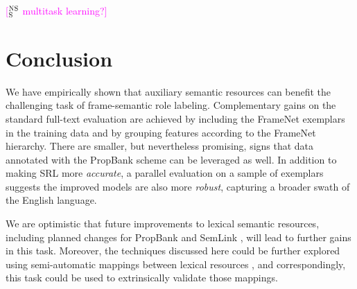 \documentclass[11pt,a4paper]{article}
\newcommand{\ensuretext}[1]{#1}
\newcommand{\nssmarker}{\ensuretext{\textcolor{magenta}{\ensuremath{^{\textsc{NS}}_{\textsc{S}}}}}}
\newcommand{\arkcomment}[3]{\ensuretext{\textcolor{#3}{[#1 #2]}}}
\newcommand{\nss}[1]{\arkcomment{\nssmarker}{#1}{magenta}}
\newcommand{\finalversion}[1]{}
\begin{document}
\nss{multitask learning?}

\section{Conclusion}

We have empirically shown that auxiliary semantic resources
can benefit the challenging task of frame-semantic role labeling.
Complementary gains on the standard full-text evaluation are achieved
by including the FrameNet exemplars in the training data 
and by grouping features according to the FrameNet hierarchy. 
There are smaller, but nevertheless promising, signs that data annotated 
with the PropBank scheme can be leveraged as well.
In addition to making SRL more \emph{accurate}, 
a parallel evaluation on a sample of exemplars suggests the 
improved models are also more \emph{robust}, 
capturing a broader swath of the English language.

We are optimistic that future improvements to lexical semantic resources, 
including planned changes for PropBank \citep{bonial-14} and SemLink \citep{bonial-13}, 
will lead to further gains in this task. 
Moreover, the techniques discussed here could be further explored 
using semi-automatic mappings between lexical resources \citep[such as UBY;][]{gurevych-12}, 
and correspondingly, this task could be used to extrinsically validate those mappings.

\finalversion{\section*{Acknowledgments}

FUNDING}

\smaller


\setlength{\bibsep}{1pt}
{\fontsize{10}{12.25}\selectfont
}
\end{document}
